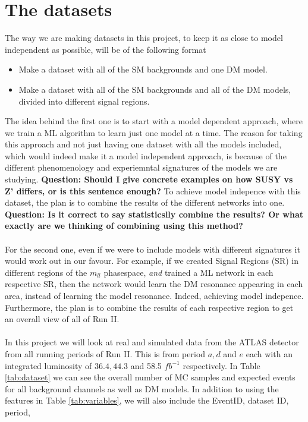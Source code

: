 \documentclass[12pt, a4paper]{book}
\begin{document}
\section{The datasets}
The way we are making datasets in this project, to keep it as close to model independent as possible, will be of the following format
\begin{itemize}
   \item Make a dataset with all of the SM backgrounds and one DM model.
   \item Make a dataset with all of the SM backgrounds and all of the DM models, divided into different signal regions.
\end{itemize}
The idea behind the first one is to start with a model dependent approach, where we train a ML algorithm to learn just one model at a time. The reason for taking this approach and not just having one dataset with all the models included, which would indeed make it 
a model independent approach, is because of the different phenomenology and experiemntal signatures of the models we are studying. \textbf{Question: Should I give concrete examples on how SUSY vs Z' differs, or is this sentence enough?} To achieve model indepence 
with this dataset, the plan is to combine the results of the different networks into one. \textbf{Question: Is it correct to say statisticslly combine the results? Or what exactly are we thinking of combining using this method?} \\
\\For the second one, even if we were to include models with different signatures it would work out in our favour. For example, if we created Signal Regions (SR) in different regions of the $m_{ll}$ phasespace, \textit{and} trained a ML network in each respective SR, 
then the network would learn the DM resonance appearing in each area, instead of learning the model resonance. Indeed, achieving model indepence. Furthermore, the plan is to combine the results of each respective region to get an overall view of all of Run II.\\
\\In this project we will look at real and simulated data from the ATLAS detector from all running periods of Run II. This is from period $a, d$ and $e$ each with an integrated luminosity of $36.4, 44.3$ and 58.5 $fb^{-1}$ respectively. 
In Table \ref{tab:dataset} we can see the overall number of MC samples and expected events for all background channels as well as DM models. In addition to using the features in Table \ref{tab:variables}, we will also include the EventID, dataset ID, period, 
\end{document}
